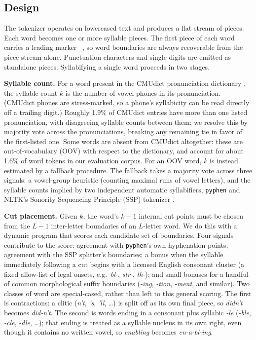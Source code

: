 \documentclass[11pt]{article}
\begin{document}
\subsection{Design}

The tokenizer operates on lowercased text and produces a flat stream of pieces. Each word becomes one or more syllable pieces. The first piece of each word carries a leading marker \texttt{\_}, so word boundaries are always recoverable from the piece stream alone. Punctuation characters and single digits are emitted as standalone pieces. Syllabifying a single word proceeds in two stages.

\textbf{Syllable count.} For a word present in the CMUdict pronunciation dictionary \citep{cmudict}, the syllable count $k$ is the number of vowel phones in its pronunciation. (CMUdict phones are stress-marked, so a phone's syllabicity can be read directly off a trailing digit.) Roughly 1.9\% of CMUdict entries have more than one listed pronunciation, with disagreeing syllable counts between them; we resolve this by majority vote across the pronunciations, breaking any remaining tie in favor of the first-listed one. Some words are absent from CMUdict altogether: these are out-of-vocabulary (OOV) with respect to the dictionary, and account for about 1.6\% of word tokens in our evaluation corpus. For an OOV word, $k$ is instead estimated by a fallback procedure. The fallback takes a majority vote across three signals: a vowel-group heuristic (counting maximal runs of vowel letters), and the syllable counts implied by two independent automatic syllabifiers, \texttt{pyphen} \citep{pyphen} and NLTK's Sonority Sequencing Principle (SSP) tokenizer \citep{nltksyl}.

\textbf{Cut placement.} Given $k$, the word's $k-1$ internal cut points must be chosen from the $L-1$ inter-letter boundaries of an $L$-letter word. We do this with a dynamic program that scores each candidate set of boundaries. Four signals contribute to the score: agreement with \texttt{pyphen}'s own hyphenation points; agreement with the SSP splitter's boundaries; a bonus when the syllable immediately following a cut begins with a licensed English consonant cluster (a fixed allow-list of legal onsets, e.g.\ \emph{bl-}, \emph{str-}, \emph{th-}); and small bonuses for a handful of common morphological suffix boundaries (\emph{-ing}, \emph{-tion}, \emph{-ment}, and similar). Two classes of word are special-cased, rather than left to this general scoring. The first is contractions: a clitic (\emph{n't}, \emph{'s}, \emph{'ll}, \ldots) is split off as its own final piece, so \emph{didn't} becomes \emph{did-n't}. The second is words ending in a consonant plus syllabic \emph{-le} (\emph{-ble}, \emph{-cle}, \emph{-dle}, \ldots); that ending is treated as a syllable nucleus in its own right, even though it contains no written vowel, so \emph{enabling} becomes \emph{en-a-bl-ing}.
\end{document}
